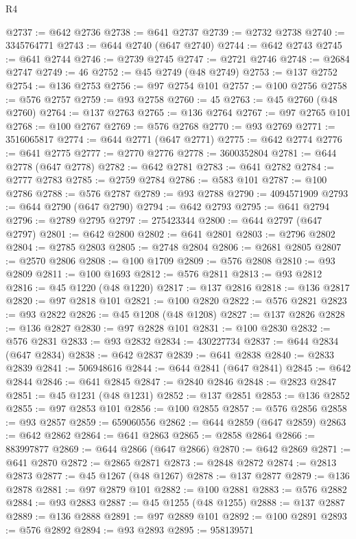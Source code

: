\begin{lexlean}{R4}
\begin{coremodule}
@2737 := @642 @2736
@2738 := @641 @2737
@2739 := @2732 @2738
@2740 := 3345764771
@2743 := @644 @2740 (@647 @2740)
@2744 := @642 @2743
@2745 := @641 @2744
@2746 := @2739 @2745
@2747 := @2721 @2746
@2748 := @2684 @2747
@2749 := 46
@2752 := @45 @2749 (@48 @2749)
@2753 := @137 @2752
@2754 := @136 @2753
@2756 := @97 @2754 @101
@2757 := @100 @2756
@2758 := @576 @2757
@2759 := @93 @2758
@2760 := 45
@2763 := @45 @2760 (@48 @2760)
@2764 := @137 @2763
@2765 := @136 @2764
@2767 := @97 @2765 @101
@2768 := @100 @2767
@2769 := @576 @2768
@2770 := @93 @2769
@2771 := 3516065817
@2774 := @644 @2771 (@647 @2771)
@2775 := @642 @2774
@2776 := @641 @2775
@2777 := @2770 @2776
@2778 := 3600352804
@2781 := @644 @2778 (@647 @2778)
@2782 := @642 @2781
@2783 := @641 @2782
@2784 := @2777 @2783
@2785 := @2759 @2784
@2786 := @583 @101
@2787 := @100 @2786
@2788 := @576 @2787
@2789 := @93 @2788
@2790 := 4094571909
@2793 := @644 @2790 (@647 @2790)
@2794 := @642 @2793
@2795 := @641 @2794
@2796 := @2789 @2795
@2797 := 275423344
@2800 := @644 @2797 (@647 @2797)
@2801 := @642 @2800
@2802 := @641 @2801
@2803 := @2796 @2802
@2804 := @2785 @2803
@2805 := @2748 @2804
@2806 := @2681 @2805
@2807 := @2570 @2806
@2808 := @100 @1709
@2809 := @576 @2808
@2810 := @93 @2809
@2811 := @100 @1693
@2812 := @576 @2811
@2813 := @93 @2812
@2816 := @45 @1220 (@48 @1220)
@2817 := @137 @2816
@2818 := @136 @2817
@2820 := @97 @2818 @101
@2821 := @100 @2820
@2822 := @576 @2821
@2823 := @93 @2822
@2826 := @45 @1208 (@48 @1208)
@2827 := @137 @2826
@2828 := @136 @2827
@2830 := @97 @2828 @101
@2831 := @100 @2830
@2832 := @576 @2831
@2833 := @93 @2832
@2834 := 430227734
@2837 := @644 @2834 (@647 @2834)
@2838 := @642 @2837
@2839 := @641 @2838
@2840 := @2833 @2839
@2841 := 506948616
@2844 := @644 @2841 (@647 @2841)
@2845 := @642 @2844
@2846 := @641 @2845
@2847 := @2840 @2846
@2848 := @2823 @2847
@2851 := @45 @1231 (@48 @1231)
@2852 := @137 @2851
@2853 := @136 @2852
@2855 := @97 @2853 @101
@2856 := @100 @2855
@2857 := @576 @2856
@2858 := @93 @2857
@2859 := 659060556
@2862 := @644 @2859 (@647 @2859)
@2863 := @642 @2862
@2864 := @641 @2863
@2865 := @2858 @2864
@2866 := 883997877
@2869 := @644 @2866 (@647 @2866)
@2870 := @642 @2869
@2871 := @641 @2870
@2872 := @2865 @2871
@2873 := @2848 @2872
@2874 := @2813 @2873
@2877 := @45 @1267 (@48 @1267)
@2878 := @137 @2877
@2879 := @136 @2878
@2881 := @97 @2879 @101
@2882 := @100 @2881
@2883 := @576 @2882
@2884 := @93 @2883
@2887 := @45 @1255 (@48 @1255)
@2888 := @137 @2887
@2889 := @136 @2888
@2891 := @97 @2889 @101
@2892 := @100 @2891
@2893 := @576 @2892
@2894 := @93 @2893
@2895 := 958139571

\end{coremodule}
\end{lexlean}
